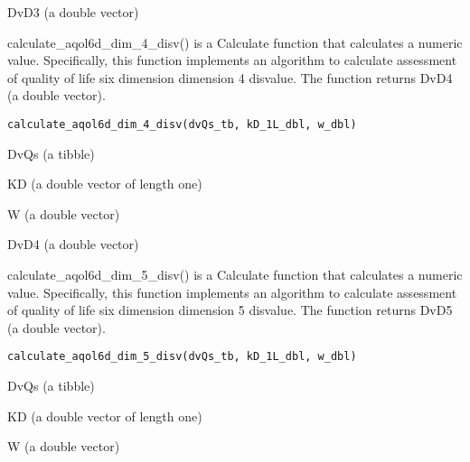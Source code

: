 \documentclass[a4paper]{book}
\begin{document}
%
\begin{Value}
DvD3 (a double vector)
\end{Value}
%
\begin{Description}\relax
calculate\_aqol6d\_dim\_4\_disv() is a Calculate function that calculates a numeric value. Specifically, this function implements an algorithm to calculate assessment of quality of life six dimension dimension 4 disvalue. The function returns DvD4 (a double vector).
\end{Description}
%
\begin{Usage}
\begin{verbatim}
calculate_aqol6d_dim_4_disv(dvQs_tb, kD_1L_dbl, w_dbl)
\end{verbatim}
\end{Usage}
%
\begin{Arguments}
\begin{ldescription}
\item[\code{dvQs\_tb}] DvQs (a tibble)

\item[\code{kD\_1L\_dbl}] KD (a double vector of length one)

\item[\code{w\_dbl}] W (a double vector)
\end{ldescription}
\end{Arguments}
%
\begin{Value}
DvD4 (a double vector)
\end{Value}
%
\begin{Description}\relax
calculate\_aqol6d\_dim\_5\_disv() is a Calculate function that calculates a numeric value. Specifically, this function implements an algorithm to calculate assessment of quality of life six dimension dimension 5 disvalue. The function returns DvD5 (a double vector).
\end{Description}
%
\begin{Usage}
\begin{verbatim}
calculate_aqol6d_dim_5_disv(dvQs_tb, kD_1L_dbl, w_dbl)
\end{verbatim}
\end{Usage}
%
\begin{Arguments}
\begin{ldescription}
\item[\code{dvQs\_tb}] DvQs (a tibble)

\item[\code{kD\_1L\_dbl}] KD (a double vector of length one)

\item[\code{w\_dbl}] W (a double vector)
\end{ldescription}
\end{Arguments}
\end{document}
